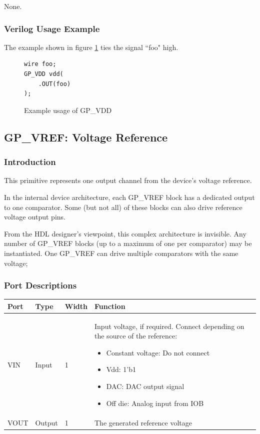\documentclass{article}
\begin{document}
None.

\subsubsection{Verilog Usage Example}

The example shown in figure \ref{gp-vdd-example} ties the signal ``foo" high.

\begin{figure}[h]
\begin{lstlisting}
wire foo;
GP_VDD vdd(
	.OUT(foo)
);
\end{lstlisting}
\caption{Example usage of GP\_VDD}
\label{gp-vdd-example}
\end{figure}


\pagebreak
\subsection{GP\_VREF: Voltage Reference}

\subsubsection{Introduction}
This primitive represents one output channel from the device's voltage reference.

In the internal device architecture, each GP\_VREF block has a dedicated output to one comparator. Some (but not all) 
of these blocks can also drive reference voltage output pins.

From the HDL designer's viewpoint, this complex architecture is invisible. Any number of GP\_VREF blocks (up to a 
maximum of one per comparator) may be instantiated. One GP\_VREF can drive multiple comparators with the same voltage; 

\subsubsection{Port Descriptions}

\begin{tabularx}{5in}{|l|l|l|X|}
\hline
{\bfseries Port} & {\bfseries Type} & {\bfseries Width} & {\bfseries Function} \\
\hline
VIN & Input & 1 & Input voltage, if required. Connect depending on the source of the reference:
	\begin{itemize}
		\item Constant voltage: Do not connect
		\item Vdd: 1'b1
		\item DAC: DAC output signal
		\item Off die: Analog input from IOB
	\end{itemize}
\\
\hline
VOUT & Output & 1 & The generated reference voltage \\
\hline
\end{tabularx}
\end{document}
